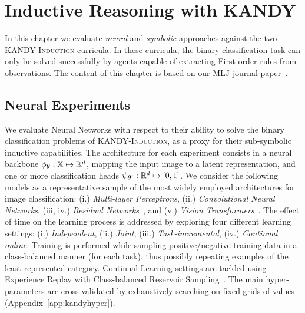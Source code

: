 \chapter{Inductive Reasoning with \textsc{KANDY}}\label{chap:kandyind}
In this chapter we evaluate {\it neural} and {\it symbolic} approaches against the two \textsc{KANDY-Induction} curricula. In these curricula, the binary classification task can only be solved successfully by agents capable of extracting First-order rules from observations.
The content of this chapter is based on our MLJ journal paper~\cite{lorello2025kandy}.


\section{Neural Experiments}\label{sec:kandy:neur-exp}
We evaluate Neural Networks with respect to their ability to solve the binary classification problems of \textsc{KANDY-Induction}, as a proxy for their sub-symbolic inductive capabilities. The architecture for each experiment consists in a neural backbone $\phi_{\bm{\theta}}: {\mathbb{X}} \mapsto \mathbb{R}^d$, mapping the input image to a latent representation, and one or more classification heads $\psi_{{\bm{\theta}}'}: \mathbb{R}^d \mapsto [0, 1]$.
We consider the following models as a representative sample of the most widely employed architectures for image classification: (i.) \textit{Multi-layer Perceptrons}, (ii.) \textit{Convolutional Neural Networks}, (iii, iv.) \textit{Residual Networks}~\cite{he2016deep}, and (v.) \textit{Vision Transformers}~\cite{dosovitskiy2020image}.
The effect of time on the learning process is addressed by exploring four different learning settings: (i.) \textit{Independent}, (ii.) \textit{Joint}, (iii.) \textit{Task-incremental}, (iv.) \textit{Continual online}.
Training is performed while sampling positive/negative training data in a class-balanced manner (for each task), thus possibly repeating examples of the least represented category. 
Continual Learning settings are tackled using Experience Replay with Class-balanced Reservoir Sampling~\cite{chrysakis2020online}. The main hyper-parameters are cross-validated by exhaustively searching on fixed grids of values (Appendix~\ref{app:kandyhyper}).
%

